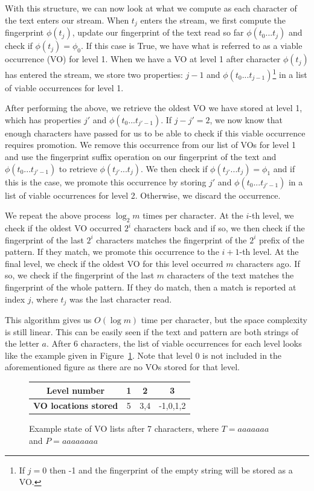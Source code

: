 \documentclass[ %
                    author={Dominic Joseph Moylett},
                    degree={MEng},
                     title={Dictionary Matching with Fingerprints},
                  subtitle={An Empirical Analysis},
                      type={research},
                      year={2015} ]{dissertation}
\begin{document}
With this structure, we can now look at what we compute as each character of the text enters our stream. When $t_j$ enters the stream, we first compute the fingerprint $\phi(t_j)$, update our fingerprint of the text read so far $\phi(t_0...t_j)$ and check if $\phi(t_j) = \phi_0$. If this case is True, we have what is referred to as a viable occurrence (VO) for level 1. When we have a VO at level 1 after character $\phi(t_j)$ has entered the stream, we store two properties: $j-1$ and $\phi(t_0...t_{j-1})$\footnote{If $j = 0$ then -1 and the fingerprint of the empty string will be stored as a VO.} in a list of viable occurrences for level 1.

After performing the above, we retrieve the oldest VO we have stored at level 1, which has properties $j'$ and $\phi(t_0...t_{j'-1})$. If $j - j' = 2$, we now know that enough characters have passed for us to be able to check if this viable occurrence requires promotion. We remove this occurrence from our list of VOs for level 1 and use the fingerprint suffix operation on our fingerprint of the text and $\phi(t_0...t_{j'-1})$ to retrieve $\phi(t_{j'}...t_j)$. We then check if $\phi(t_{j'}...t_j) = \phi_1$ and if this is the case, we promote this occurrence by storing $j'$ and $\phi(t_0...t_{j'-1})$ in a list of viable occurrences for level 2. Otherwise, we discard the occurrence.

We repeat the above process $\log_2m$ times per character. At the $i$-th level, we check if the oldest VO occurred $2^i$ characters back and if so, we then check if the fingerprint of the last $2^i$ characters matches the fingerprint of the $2^i$ prefix of the pattern. If they match, we promote this occurrence to the $i+1$-th level. At the final level, we check if the oldest VO for this level occurred $m$ characters ago. If so, we check if the fingerprint of the last $m$ characters of the text matches the fingerprint of the whole pattern. If they do match, then a match is reported at index $j$, where $t_j$ was the last character read.

This algorithm gives us $O(\log m)$ time per character, but the space complexity is still linear. This can be easily seen if the text and pattern are both strings of the letter $a$. After 6 characters, the list of viable occurrences for each level looks like the example given in Figure~\ref{fig:pp-vos}. Note that level 0 is not included in the aforementioned figure as there are no VOs stored for that level.

\begin{figure}[t]
\centering
\begin{tabular}{|c|c|c|c|}
  \hline
  \textbf{Level number} & 1 & 2 & 3 \\
  \hline
  \textbf{VO locations stored} & 5 & 3,4 & -1,0,1,2 \\
  \hline
\end{tabular}
\caption{Example state of VO lists after 7 characters, where $T = aaaaaaa$ and $P = aaaaaaaa$}
\label{fig:pp-vos}
\end{figure}
\end{document}
